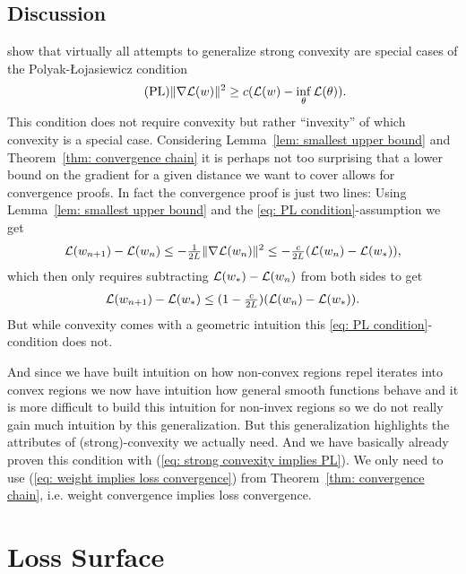 \subsection{Discussion}

\textcite{karimiLinearConvergenceGradient2020} show that virtually all
attempts to generalize strong convexity are special cases of the
Polyak-\L{}ojasiewicz condition
\begin{align}
	\label{eq: PL condition}\tag{PL}
	\|\nabla \mathcal{L}(w) \|^2 \ge c(\mathcal{L}(w)-\inf_{\theta}\mathcal{L}(\theta)).
\end{align}
This condition does not require convexity but rather ``invexity'' of which
convexity is a special case. Considering Lemma~\ref{lem: smallest upper bound}
and Theorem~\ref{thm: convergence chain} it is perhaps not too surprising that a
lower bound on the gradient for a given distance we want to cover allows for
convergence proofs. In fact the convergence proof is just two lines:
Using Lemma~\ref{lem: smallest upper bound} and the \ref{eq: PL condition}-assumption we get
\begin{align*}
	\mathcal{L}(w_{n+1})- \mathcal{L}(w_n) \le -\tfrac1{2L} \|\nabla\mathcal{L}(w_n)\|^2
	\le -\tfrac{c}{2L}(\mathcal{L}(w_n) - \mathcal{L}(w_*)),
\end{align*}
which then only requires subtracting \(\mathcal{L}(w_*)-\mathcal{L}(w_n)\) from
both sides to get
\begin{align*}
	\mathcal{L}(w_{n+1}) - \mathcal{L}(w_*)
	\le (1-\tfrac{c}{2L})(\mathcal{L}(w_n) - \mathcal{L}(w_*)).
\end{align*}
But while convexity comes with a geometric intuition this \ref{eq: PL
condition}-condition does not.

And since we have built intuition on how non-convex regions
repel iterates into convex regions we now have intuition how general smooth
functions behave and it is more difficult to build this intuition for non-invex
regions so we do not really gain much intuition by this generalization. But
this generalization highlights the attributes of (strong)-convexity we
actually need. And we have basically already proven this condition with
(\ref{eq: strong convexity implies PL}). We only need to use (\ref{eq: weight
implies loss convergence}) from Theorem~\ref{thm: convergence chain}, i.e.
weight convergence implies loss convergence.

\section{Loss Surface}\label{sec: loss surface}

